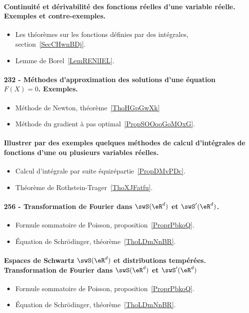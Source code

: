 \paragraph{Continuité et dérivabilité des fonctions réelles d'une variable réelle. Exemples et contre-exemples.}
\begin{itemize}
    \item Les théorèmes sur les fonctions définies par des intégrales, section~\ref{SecCHwnBDj}.
    \item Lemme de Borel~\ref{LemRENlIEL}.
\end{itemize}
\paragraph{232 - Méthodes d'approximation des solutions d’une équation $F(X)=0$. Exemples.}
\begin{itemize}
    \item Méthode de Newton, théorème~\ref{ThoHGpGwXk}
    \item Méthode du gradient à pas optimal~\ref{PropSOOooGoMOxG}.
\end{itemize}
\paragraph{Illustrer par des exemples quelques méthodes de calcul d'intégrales de fonctions d’une ou plusieurs variables réelles.}
\begin{itemize}
    \item Calcul d'intégrale par suite équirépartie~\ref{PropDMvPDc}.
    \item Théorème de Rothstein-Trager~\ref{ThoXJFatfu}.
\end{itemize}
\paragraph{256 - Transformation de Fourier dans \( \swS(\eR^d)\) et \( \swS'(\eR^d)\).}
\begin{itemize}
    \item Formule sommatoire de Poisson, proposition~\ref{ProprPbkoQ}.
    \item Équation de Schrödinger, théorème~\ref{ThoLDmNnBR}.
\end{itemize}
\paragraph{Espaces de Schwartz \( \swS(\eR^d)\) et distributions tempérées. Transformation de Fourier dans \( \swS(\eR^d)\) et \( \swS'(\eR^d)\)}
\begin{itemize}
    \item Formule sommatoire de Poisson, proposition~\ref{ProprPbkoQ}.
    \item Équation de Schrödinger, théorème~\ref{ThoLDmNnBR}.
\end{itemize}
